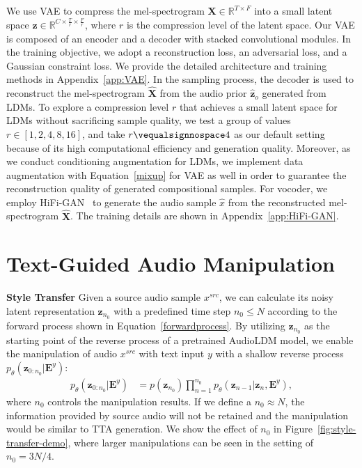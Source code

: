 We use VAE to compress the mel-spectrogram $\boldsymbol{X}\in \mathbb{R}^{T\times F}$ into a small latent space $\boldsymbol{z}\in \mathbb{R}^{C\times \frac{T}{r}\times \frac{F}{r}}$, where $r$ is the compression level of the latent space. Our VAE is composed of an encoder and a decoder with stacked convolutional modules. In the training objective, we adopt a reconstruction loss, an adversarial loss, and a Gaussian constraint loss. We provide the detailed architecture and training methods in Appendix~\ref{app:VAE}. In the sampling process, the decoder is used to reconstruct the mel-spectrogram $\boldsymbol{\hat{X}}$ from the audio prior $\boldsymbol{\hat{z}}_{o}$ generated from LDMs. To explore a compression level $r$ that achieves a small latent space for LDMs without sacrificing sample quality, we test a group of values $r\in \left[1,2, 4,8,16\right]$, and take $r\vequalsignnospace4$ as our default setting because of its high computational efficiency and generation quality. Moreover, as we conduct conditioning augmentation for LDMs, we implement data augmentation with Equation~\ref{mixup} for VAE as well in order to guarantee the reconstruction quality of generated compositional samples. For vocoder, we employ HiFi-GAN~\cite{kong2020hifi} to generate the audio sample $\hat{x}$ from the reconstructed mel-spectrogram $\boldsymbol{\hat{X}}$. The training details are shown in Appendix~\ref{app:HiFi-GAN}.

\section{Text-Guided Audio Manipulation}
\label{AudioLDM}

\textbf{Style Transfer}
\label{AST}
Given a source audio sample $x^{src}$, we can calculate its noisy latent representation $\boldsymbol{z}_{n_{0}}$ with a predefined time step $n_{0}\leq N$ according to the forward process shown in Equation~\ref{forwardprocess}. By utilizing $\boldsymbol{z}_{n_{0}}$ as the starting point of the reverse process of a pretrained AudioLDM model, we enable the manipulation of audio $x^{src}$ with text input $y$ with a shallow reverse process $p_{\theta}(\boldsymbol{z}_{0:n_{0}}|\boldsymbol{E}^{y})$:
\begin{align}
\label{shallowreverse}
p_{\theta}(\boldsymbol{z}_{0:n_{0}}|\boldsymbol{E}^{y})&=p(\boldsymbol{z}_{n_{0}})\prod_{n=1}^{n_{0}}p_{\theta}(\boldsymbol{z}_{n-1}|\boldsymbol{z}_{n},\boldsymbol{E}^{y}),
\end{align}
where $n_{0}$ controls the manipulation results. If we define a $n_{0}\approx N$, the information provided by source audio will not be retained and the manipulation would be similar to TTA generation. We show the effect of $n_{0}$ in Figure~\ref{fig:style-transfer-demo}, where larger manipulations can be seen in the setting of $n_{0}=3N/4$.

